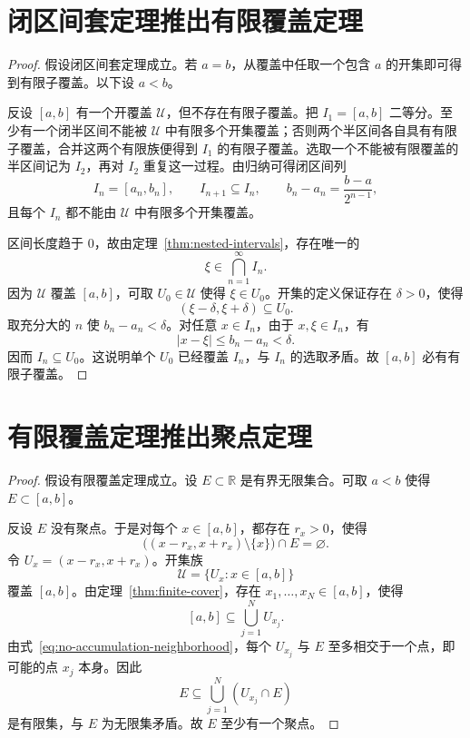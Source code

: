 \documentclass[UTF8,12pt,a4paper,fontset=fandol,oneside]{ctexart}
\begin{document}
\section{闭区间套定理推出有限覆盖定理}

\begin{proof}
  假设闭区间套定理成立。若 $a=b$，从覆盖中任取一个包含 $a$ 的开集即可得到有限子覆盖。以下设 $a<b$。

  反设 $[a,b]$ 有一个开覆盖 $\mathcal U$，但不存在有限子覆盖。把 $I_1=[a,b]$ 二等分。至少有一个闭半区间不能被 $\mathcal U$ 中有限多个开集覆盖；否则两个半区间各自具有有限子覆盖，合并这两个有限族便得到 $I_1$ 的有限子覆盖。选取一个不能被有限覆盖的半区间记为 $I_2$，再对 $I_2$ 重复这一过程。由归纳可得闭区间列
  \[
    I_n=[a_n,b_n],
    \qquad
    I_{n+1}\subseteq I_n,
    \qquad
    b_n-a_n=\frac{b-a}{2^{n-1}},
  \]
  且每个 $I_n$ 都不能由 $\mathcal U$ 中有限多个开集覆盖。

  区间长度趋于 $0$，故由定理~\ref{thm:nested-intervals}，存在唯一的
  \[
    \xi\in\bigcap_{n=1}^{\infty}I_n.
  \]
  因为 $\mathcal U$ 覆盖 $[a,b]$，可取 $U_0\in\mathcal U$ 使得 $\xi\in U_0$。开集的定义保证存在 $\delta>0$，使得
  \[
    (\xi-\delta,\xi+\delta)\subseteq U_0.
  \]
  取充分大的 $n$ 使 $b_n-a_n<\delta$。对任意 $x\in I_n$，由于 $x,\xi\in I_n$，有
  \[
    |x-\xi|\leq b_n-a_n<\delta.
  \]
  因而 $I_n\subseteq U_0$。这说明单个 $U_0$ 已经覆盖 $I_n$，与 $I_n$ 的选取矛盾。故 $[a,b]$ 必有有限子覆盖。
\end{proof}

\section{有限覆盖定理推出聚点定理}

\begin{proof}
  假设有限覆盖定理成立。设 $E\subset\mathbb R$ 是有界无限集合。可取 $a<b$ 使得 $E\subset[a,b]$。

  反设 $E$ 没有聚点。于是对每个 $x\in[a,b]$，都存在 $r_x>0$，使得
  \begin{equation}
    \bigl((x-r_x,x+r_x)\setminus\{x\}\bigr)\cap E=\varnothing.
    \label{eq:no-accumulation-neighborhood}
  \end{equation}
  令 $U_x=(x-r_x,x+r_x)$。开集族
  \[
    \mathcal U=\{U_x:x\in[a,b]\}
  \]
  覆盖 $[a,b]$。由定理~\ref{thm:finite-cover}，存在 $x_1,\ldots,x_N\in[a,b]$，使得
  \[
    [a,b]\subseteq\bigcup_{j=1}^{N}U_{x_j}.
  \]
  由式~\eqref{eq:no-accumulation-neighborhood}，每个 $U_{x_j}$ 与 $E$ 至多相交于一个点，即可能的点 $x_j$ 本身。因此
  \[
    E\subseteq\bigcup_{j=1}^{N}(U_{x_j}\cap E)
  \]
  是有限集，与 $E$ 为无限集矛盾。故 $E$ 至少有一个聚点。
\end{proof}
\end{document}
